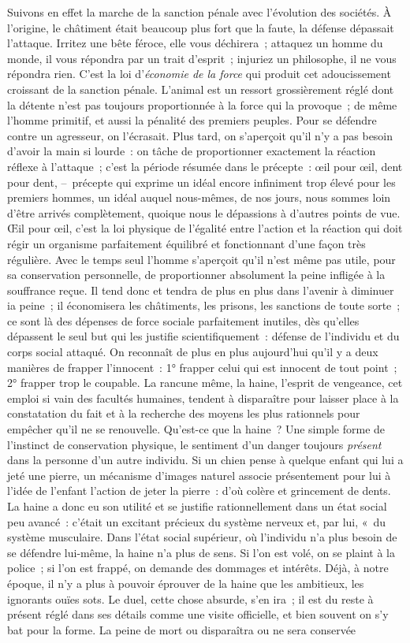 \documentclass[french,twoside]{book} %
\begin{document}
Suivons en effet la marche de la sanction pénale avec l’évolution des sociétés. À l’origine, le châtiment était beaucoup plus fort que la faute, la défense dépassait l’attaque. Irritez une bête féroce, elle vous déchirera ; attaquez un homme du monde, il vous répondra par un trait d’esprit ; injuriez un philosophe, il ne vous répondra rien. C’est la loi d’\emph{économie de la force} qui produit cet adoucissement croissant de la sanction pénale. L’animal est un ressort grossièrement réglé dont la détente n’est pas toujours proportionnée à la force qui la provoque ; de même l’homme primitif, et aussi la pénalité des premiers peuples. Pour se défendre contre un agresseur, on l’écrasait. Plus tard, on s’aperçoit qu’il n’y a pas besoin d’avoir la main si lourde : on tâche de proportionner exactement la réaction réflexe à l’attaque ; c’est la période résumée dans le précepte : œil pour œil, dent pour dent, – précepte qui exprime un idéal encore infiniment trop élevé pour les premiers hommes, un idéal auquel nous-mêmes, de nos jours, nous sommes loin d’être arrivés complètement, quoique nous le dépassions à d’autres points de vue. Œil pour œil, c’est la loi physique de l’égalité entre l’action et la réaction qui doit régir un organisme parfaitement équilibré et fonctionnant d’une façon très régulière. Avec le temps seul l’homme s’aperçoit qu’il n’est même pas utile, pour sa conservation personnelle, de proportionner absolument la peine infligée à la souffrance reçue. Il tend donc et tendra de plus en plus dans l’avenir à diminuer ia peine ; il économisera les châtiments, les prisons, les sanctions de toute sorte ; ce sont là des dépenses de force sociale parfaitement inutiles, dès qu’elles dépassent le seul but qui les justifie scientifiquement : défense de l’individu et du corps social attaqué. On reconnaît de plus en plus aujourd’hui qu’il y a deux manières de frapper l’innocent : 1° frapper celui qui est innocent de tout point ; 2° frapper trop le coupable. La rancune même, la haine, l’esprit de vengeance, cet emploi si vain des facultés humaines, tendent à disparaître pour laisser place à la constatation du fait et à la recherche des moyens les plus rationnels pour empêcher qu’il ne se renouvelle. Qu’est-ce que la haine ? Une simple forme de l’instinct de conservation physique, le sentiment d’un danger toujours \emph{présent} dans la personne d’un autre individu. Si un chien pense à quelque enfant qui lui a jeté une pierre, un mécanisme d’images naturel associe présentement pour lui à l’idée de l’enfant l’action de jeter la pierre : d’où colère et grincement de dents. La haine a donc eu son utilité et se justifie rationnellement dans un état social peu avancé : c’était un excitant précieux du système nerveux et, par lui, « du système musculaire. Dans l’état social supérieur, où l’individu n’a plus besoin de se défendre lui-même, la haine n’a plus de sens. Si l’on est volé, on se plaint à la police ; si l’on est frappé, on demande des dommages et intérêts. Déjà, à notre époque, il n’y a plus à pouvoir éprouver de la haine que les ambitieux, les ignorants ouïes sots. Le duel, cette chose absurde, s’en ira ; il est du reste à présent réglé dans ses détails comme une visite officielle, et bien souvent on s’y bat pour la forme. La peine de mort ou disparaîtra ou ne sera conservée 
\end{document}
